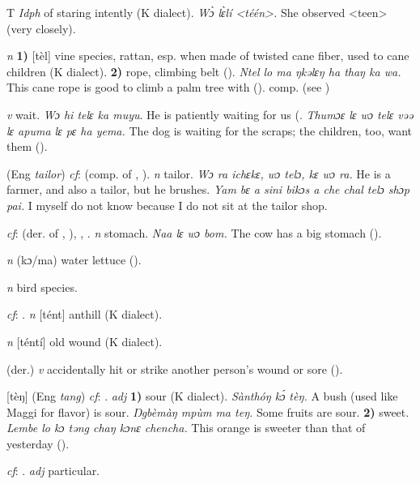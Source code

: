 \begin{letter}{T}
 \textit{Idph} of staring intently (K dialect). \textit{Wɔ̀ lɛ̀lí <téén>.} She observed <teen> (very closely).

 \textit{n} \textbf{1)} [tèl] vine species, rattan, esp. when made of twisted cane fiber, used to cane children (K dialect). \textbf{2)} rope, climbing belt (\citealt{Pichl1967}). \textit{Ntel lo ma ŋkəlɛŋ ha thaŋ ka wa.} This cane rope is good to climb a palm tree with (\citealt{Pichl1967}). comp.  (see ) 

 \textit{v} wait. \textit{Wɔ hi telɛ ka muyu}. He is patiently waiting for us (\citealt{Pichl1967}. \textit{Thumɔɛ lɛ wɔ telɛ vəə lɛ apuma lɛ pɛ ha yema.} The dog is waiting for the scraps; the children, too, want them (\citealt{Pichl1967}). 

 (Eng \textit{tailor}) \textit{cf}:  (comp. of , ). \textit{n} tailor. \textit{Wɔ ra ichɛkɛ, wɔ telɔ, kɛ wɔ ra.} He is a farmer, and also a tailor, but he brushes. \textit{Yam bɛ a sini bikɔs a che chal telɔ shɔp pai.} I myself do not know because I do not sit at the tailor shop.

 \textit{cf}:  (der. of , ), , . \textit{n} stomach. \textit{Naa lɛ wɔ bom.} The cow has a big stomach (\citealt{Pichl1967}). 

 \textit{n} (kɔ/ma) water lettuce (\citealt{Pichl1967}). 

 \textit{n} bird species. 

 \textit{cf}: . \textit{n} [tént] anthill (K dialect).

 \textit{n} [téntí] old wound (K dialect). 

 (der.) \textit{v} accidentally hit or strike another person's wound or sore (\citealt{Pichl1967}).

 [tèŋ] (Eng \textit{tang}) \textit{cf}: . \textit{adj} \textbf{1)} sour (K dialect). \textit{Sànthóŋ kɔ́ tèŋ.} A bush (used like Maggi for flavor) is sour. \textit{Ŋgbèmàŋ mpùm ma teŋ.} Some fruits are sour. \textbf{2)} sweet. \textit{Lembe lo kɔ təng chaŋ kɔnɛ chencha.} This orange is sweeter than that of yesterday (\citealt{Pichl1967}). 

 \textit{cf}: . \textit{adj} particular.


\end{letter}
